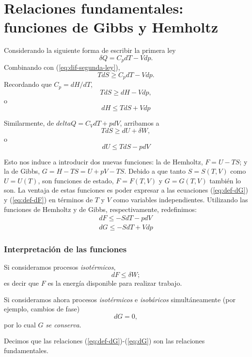 \documentclass[openany]{book}
\begin{document}
\section{Relaciones fundamentales: funciones de Gibbs y Hemholtz}
Considerando la siguiente forma de escribir la primera ley
\begin{equation*}
	\delta Q=C_{p}dT-Vdp.
\end{equation*}
Combinando con (\ref{eq:dif-segunda-ley}),
\begin{equation*}
	TdS\geq C_{p}dT-Vdp.
\end{equation*}
Recordando que $C_{p}=dH/dT$,
\begin{equation*}
	TdS\geq dH-Vdp,
\end{equation*}
o
\begin{equation}\label{eq:def-dG}
	dH\leq TdS+Vdp
\end{equation}
\par Similarmente, de $delta Q=C_{V}dT+pdV$, arribamos a
\begin{equation*}
	TdS\geq dU+\delta W,
\end{equation*}
o
\begin{equation}\label{eq:def-dF}
	dU\leq TdS-pdV
\end{equation}
\par Esto nos induce a introducir dos nuevas funciones: la de Hemholtz, $F=U-TS$; y la de Gibbs, $G=H-TS=U+pV-TS$. Debido a que tanto $S=S(T,V)$ como $U=U(T)$, son funciones de estado, $F=F(T,V)$ y $G=G(T,V)$ también lo son. La ventaja de estas funciones es poder expresar a las ecuaciones (\ref{eq:def-dG}) y (\ref{eq:def-dF}) en términos de $T$ y $V$ como variables independientes. Utilizando las funciones de Hemholtz y de Gibbs, respectivamente, redefinimos:
\begin{gather}
	dF\leq-SdT-pdV \label{eq:dF}\\
	dG\leq-SdT+Vdp \label{eq:dG}
\end{gather}

\subsubsection{Interpretación de las funciones}
Si consideramos procesos \emph{isotérmicos},
\begin{equation*}
	dF\leq\delta W;
\end{equation*}
es decir que $F$ es la energía disponible para realizar trabajo.
\par Si consideramos ahora procesos \emph{isotérmicos} e \emph{isobáricos} simultáneamente (por ejemplo, cambios de fase)
\begin{equation*}
	dG=0,
\end{equation*}
por lo cual $G$ {\sl se conserva}.
\par Decimos que las relaciones (\ref{eq:def-dG})-(\ref{eq:dG}) son las {\sc relaciones fundamentales}.
\end{document}

